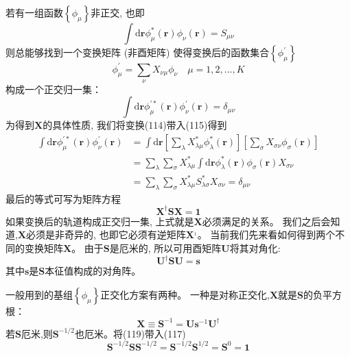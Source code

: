 \documentclass[]{article}
\begin{document}
若有一组函数$\left\lbrace\phi_{\mu}\right\rbrace  $非正交, 也即
\begin{equation}
	\int\mathrm{d}\mathbf{r}\phi^*_{\mu}(\mathbf{r})\phi_{\nu}(\mathbf{r})=S_{\mu\nu}
\end{equation}
则总能够找到一个变换矩阵 (非酉矩阵) 使得变换后的函数集合$\left\lbrace\phi^{\prime}_{\mu}\right\rbrace  $
\begin{equation}
	\phi^{\prime}_{\mu}=\sum\limits_{\nu}X_{\nu\mu}\phi_{\nu}\quad\mu=1,2,...,K
\end{equation}
构成一个正交归一集：
\begin{equation}
	\int\mathrm{d}\mathbf{r}\phi^{\prime *}_{\mu}(\mathbf{r})\phi^{\prime}_{\nu}(\mathbf{r})=\delta_{\mu\nu}
\end{equation}
为得到$\mathbf{X}$的具体性质, 我们将变换(114)带入(115)得到
\begin{align}
	\int\mathrm{d}\mathbf{r}\phi^{\prime *}_{\mu}(\mathbf{r})\phi^{\prime}_{\nu}(\mathbf{r})
	&=\int\mathrm{d}\mathbf{r}\left[ \sum\limits_{\lambda}X^*_{\lambda\mu}\phi^*_{\lambda}(\mathbf{r})\right] \left[ \sum\limits_{\sigma}X_{\sigma\nu}\phi_{\sigma}(\mathbf{r})\right]\nonumber\\
	&=\sum\limits_{\lambda}\sum\limits_{\sigma}X^*_{\lambda\mu}\int\mathrm{d}\mathbf{r}\phi^*_{\lambda}(\mathbf{r})\phi_{\sigma}(\mathbf{r})X_{\sigma\nu}\nonumber\\
	&=\sum\limits_{\lambda}\sum\limits_{\sigma}X^*_{\lambda\mu}S^*_{\lambda\sigma}X_{\sigma\nu}=\delta_{\mu\nu}
\end{align}
最后的等式可写为矩阵方程
\begin{equation}
	\mathbf{X^{\dagger}SX=1}
\end{equation}
如果变换后的轨道构成正交归一集, 上式就是$\mathbf{X}$必须满足的关系。 我们之后会知道,$\mathbf{X}$必须是非奇异的, 也即它必须有逆矩阵$\mathbf{X}^{_1}$。 当前我们先来看如何得到两个不同的变换矩阵$\mathbf{X}$。 由于$\mathbf{S}$是厄米的, 所以可用酉矩阵$\mathbf{U}$将其对角化:
\begin{equation}
	\mathbf{U^{\dagger}SU=s}
\end{equation}
其中$\mathbf{s}$是$\mathbf{S}$本征值构成的对角阵。

一般用到的基组$\left\lbrace\phi_{\mu}\right\rbrace  $正交化方案有两种。 一种是对称正交化,$\mathbf{X}$就是$\mathbf{S}$的负平方根：
\begin{equation}
	\mathbf{X}\equiv\mathbf{S}^{-1}=\mathbf{U}\mathbf{s}^{-1}\mathbf{U}^{\dagger}
\end{equation}
若$\mathbf{S}$厄米,则$\mathbf{S}^{-1/2}$也厄米。将(119)带入(117)
\begin{equation}
	\mathbf{S}^{-1/2}\mathbf{SS}^{-1/2}=\mathbf{S}^{-1/2}\mathbf{S}^{1/2}=\mathbf{S}^0=\mathbf{1}
\end{equation}
\end{document}
